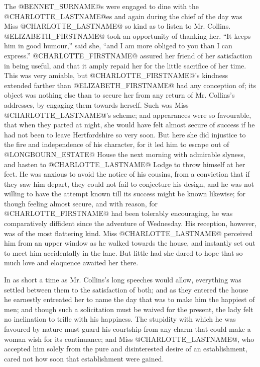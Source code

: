 The @BENNET_SURNAME@s were engaged to dine with the @CHARLOTTE_LASTNAME@es and again during the
chief of the day was Miss @CHARLOTTE_LASTNAME@ so kind as to listen to Mr. Collins.
@ELIZABETH_FIRSTNAME@ took an opportunity of thanking her. ``It keeps him in good
humour,'' said she, ``and I am more obliged to you than I can express.''
@CHARLOTTE_FIRSTNAME@ assured her friend of her satisfaction in being useful, and
that it amply repaid her for the little sacrifice of her time. This was
very amiable, but @CHARLOTTE_FIRSTNAME@'s kindness extended farther than @ELIZABETH_FIRSTNAME@
had any conception of; its object was nothing else than to secure her
from any return of Mr. Collins's addresses, by engaging them towards
herself. Such was Miss @CHARLOTTE_LASTNAME@'s scheme; and appearances were so
favourable, that when they parted at night, she would have felt almost
secure of success if he had not been to leave Hertfordshire so very
soon. But here she did injustice to the fire and independence of his
character, for it led him to escape out of @LONGBOURN_ESTATE@ House the next
morning with admirable slyness, and hasten to @CHARLOTTE_LASTNAME@ Lodge to throw
himself at her feet. He was anxious to avoid the notice of his cousins,
from a conviction that if they saw him depart, they could not fail to
conjecture his design, and he was not willing to have the attempt known
till its success might be known likewise; for though feeling almost
secure, and with reason, for @CHARLOTTE_FIRSTNAME@ had been tolerably encouraging,
he was comparatively diffident since the adventure of Wednesday.
His reception, however, was of the most flattering kind. Miss @CHARLOTTE_LASTNAME@
perceived him from an upper window as he walked towards the house, and
instantly set out to meet him accidentally in the lane. But little had
she dared to hope that so much love and eloquence awaited her there.

In as short a time as Mr. Collins's long speeches would allow,
everything was settled between them to the satisfaction of both; and as
they entered the house he earnestly entreated her to name the day that
was to make him the happiest of men; and though such a solicitation must
be waived for the present, the lady felt no inclination to trifle with
his happiness. The stupidity with which he was favoured by nature must
guard his courtship from any charm that could make a woman wish for its
continuance; and Miss @CHARLOTTE_LASTNAME@, who accepted him solely from the pure
and disinterested desire of an establishment, cared not how soon that
establishment were gained.

